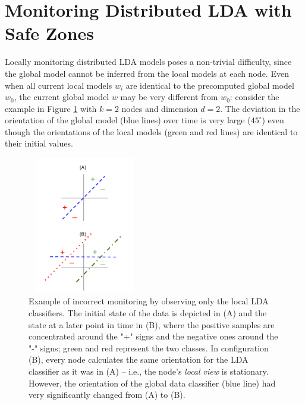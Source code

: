 

\section{Monitoring Distributed LDA with Safe Zones}
Locally monitoring distributed LDA models poses a non-trivial difficulty, since the global model cannot be inferred from the local models at each node. Even when all current local models $w_i$ are identical to the precomputed global model $w_0$, the current global model $w$ may be very different from  $w_0$: consider the example in Figure \ref{NegativeExample} with $k = 2$ nodes and dimension $d =2$. The deviation
in the orientation of the global model (blue lines) over time is very large ($45^{\circ}$) even though the orientations of the local models (green and red lines) are identical to their
initial values.

\begin{figure}[H]
\centering
\includegraphics[width=50mm, height=6cm]{graphics/NegativeExample.png}
\caption{Example of incorrect monitoring by observing only the local LDA classifiers. The
initial state of the data is depicted in (A) and the state at a later point
in time
in (B), where the positive samples are concentrated around the "+" signs and
the negative ones around the "-" signs; green and red represent the two classes.
In configuration (B), every node  calculates the same orientation
for the LDA classifier as it was in (A) -- i.e., the node's \emph{local view} is
stationary. However, the orientation of the global data classifier (blue line) had very
significantly changed from (A) to (B).}
\label{NegativeExample}
\end{figure}


